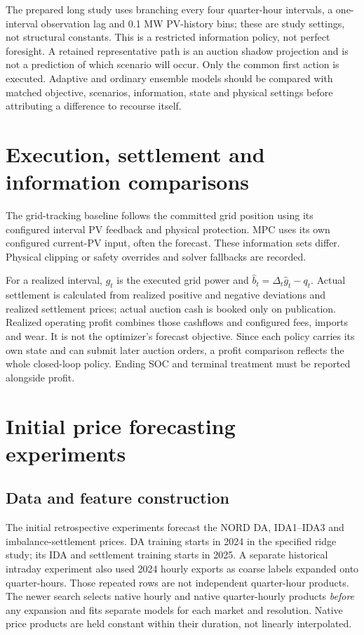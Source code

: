 \documentclass[11pt,a4paper]{article}
\begin{document}
The prepared long study uses branching every four quarter-hour intervals, a
one-interval observation lag and 0.1 MW PV-history bins; these are study
settings, not structural constants. This is a restricted information policy,
not perfect foresight. A retained representative path is an auction shadow
projection and is not a prediction of which scenario will occur. Only the
common first action is executed. Adaptive and ordinary ensemble models should
be compared with matched objective, scenarios, information, state and physical
settings before attributing a difference to recourse itself.

\section{Execution, settlement and information comparisons}
The grid-tracking baseline follows the committed grid position using its
configured interval PV feedback and physical protection. MPC uses its own
configured current-PV input, often the forecast. These information sets differ.
Physical clipping or safety overrides and solver fallbacks are recorded.

For a realized interval, $\hat g_t$ is the executed grid power and
$\hat b_t=\Delta_t\hat g_t-q_t$. Actual settlement is calculated from realized
positive and negative deviations and realized settlement prices; actual auction
cash is booked only on publication. Realized operating profit combines those
cashflows and configured fees, imports and wear. It is not the optimizer's
forecast objective. Since each policy carries its own state and can submit
later auction orders, a profit comparison reflects the whole closed-loop policy.
Ending SOC and terminal treatment must be reported alongside profit.

\section{Initial price forecasting experiments}
\subsection{Data and feature construction}
The initial retrospective experiments forecast the NORD DA, IDA1--IDA3 and
imbalance-settlement prices. DA training starts in 2024 in the specified ridge
study; its IDA and settlement training starts in 2025. A separate historical
intraday experiment also used 2024 hourly exports as coarse labels expanded
onto quarter-hours. Those repeated rows are not independent quarter-hour
products. The newer search selects native hourly and native quarter-hourly
products \emph{before} any expansion and fits separate models for each market
and resolution. Native price products are held constant within their duration,
not linearly interpolated.
\end{document}
